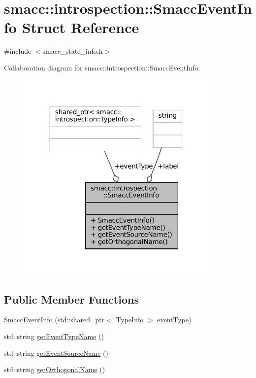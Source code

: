 \hypertarget{structsmacc_1_1introspection_1_1SmaccEventInfo}{}\section{smacc\+:\+:introspection\+:\+:Smacc\+Event\+Info Struct Reference}
\label{structsmacc_1_1introspection_1_1SmaccEventInfo}


{\ttfamily \#include $<$smacc\+\_\+state\+\_\+info.\+h$>$}



Collaboration diagram for smacc\+:\+:introspection\+:\+:Smacc\+Event\+Info\+:
\nopagebreak
\begin{figure}[H]
\begin{center}
\leavevmode
\includegraphics[width=282pt]{structsmacc_1_1introspection_1_1SmaccEventInfo__coll__graph}
\end{center}
\end{figure}
\subsection*{Public Member Functions}
\begin{DoxyCompactItemize}
\item 
\hyperlink{structsmacc_1_1introspection_1_1SmaccEventInfo_a322035851e387c9cb58bc1cfe4c68544}{Smacc\+Event\+Info} (std\+::shared\+\_\+ptr$<$ \hyperlink{classsmacc_1_1introspection_1_1TypeInfo}{Type\+Info} $>$ \hyperlink{structsmacc_1_1introspection_1_1SmaccEventInfo_af3bdf1abf797864e681662d92a5515f9}{event\+Type})
\item 
std\+::string \hyperlink{structsmacc_1_1introspection_1_1SmaccEventInfo_ae0ed6a9506dbe526269a0bd956a71044}{get\+Event\+Type\+Name} ()
\item 
std\+::string \hyperlink{structsmacc_1_1introspection_1_1SmaccEventInfo_af9e90a557f8f62069a17234f79bcefa0}{get\+Event\+Source\+Name} ()
\item 
std\+::string \hyperlink{structsmacc_1_1introspection_1_1SmaccEventInfo_a7a507eea65876ba22033300f316cae89}{get\+Orthogonal\+Name} ()
\end{DoxyCompactItemize}
